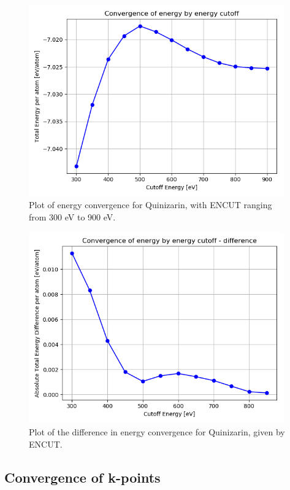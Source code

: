 \documentclass{article}
\begin{document}
    \begin{figure}[H]
      \centering
      \includegraphics[width = 11cm]{../fig/convergence_energy.png}
      \caption{Plot of energy convergence for Quinizarin, with ENCUT ranging from 300 eV to 900 eV. }
      \label{fig:convergence_energy}
    \end{figure}

    \begin{figure}[H]
      \centering
      \includegraphics[width = 11cm]{../fig/convergence_energy_difference.png}
      \caption{Plot of the difference in energy convergence for Quinizarin, given by ENCUT. }
      \label{fig:convergence_energy_difference}
    \end{figure}

    \vspace{1cm}

  \subsection{Convergence of k-points}
\end{document}
